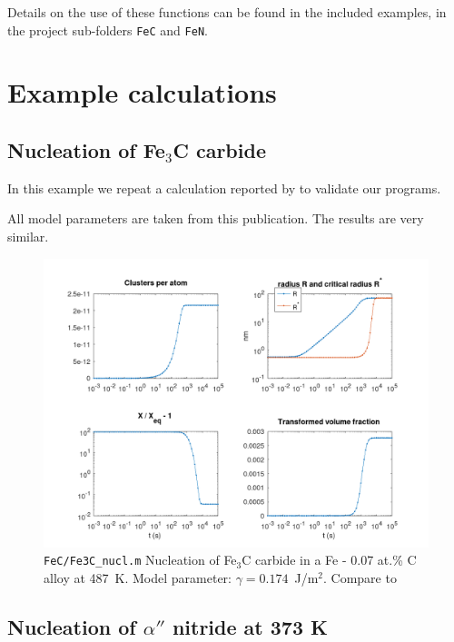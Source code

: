 \documentclass[12pt,a4paper]{article}
\begin{document}
Details on the use of these functions can be found in the included examples, in the project sub-folders \texttt{FeC} and \texttt{FeN}. 

\pagebreak

\section{Example calculations}

\subsection{Nucleation of Fe$_3$C carbide}

In this example we repeat a calculation reported by \citet{Perez-2003-ID509} to validate our programs.

All model parameters are taken from this publication. The results are very similar.

\begin{figure}[h]
\centering 
\includegraphics[width=\textwidth]{../FeC/Fe3C_nucl.png} 
\caption{\texttt{FeC/Fe3C\_nucl.m} Nucleation of Fe$_3$C carbide in a Fe - 0.07 at.\% C alloy at 487~K. Model parameter: $\gamma = 0.174$~J/m$^2$. Compare to \citet{Perez-2003-ID509}}
\end{figure}

\pagebreak

\subsection{Nucleation of $\alpha ''$ nitride at 373 K}
\end{document}
